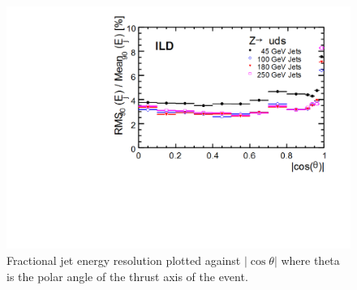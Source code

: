 \begin{figure}[t!]

\includegraphics[width=0.8\hsize]{Introduction/fig/ild01_o1_pflow.png}

\caption{\label{ild:fig:intro:pflow}Fractional jet energy resolution
    plotted against $|\cos\theta|$ where theta is the polar angle of the thrust axis of the event. }
\end{figure}


